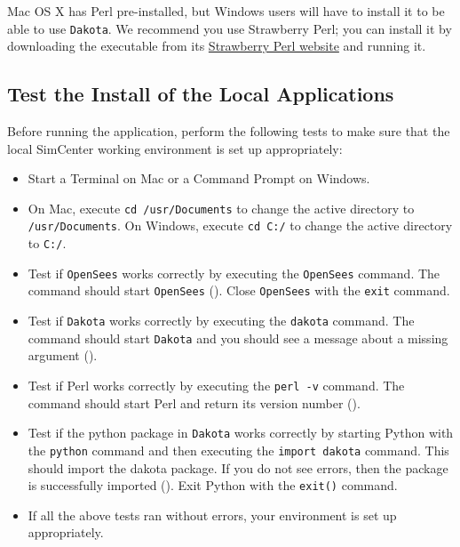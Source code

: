 Mac OS X has Perl pre-installed, but Windows users will have to
install it to be able to use \texttt{Dakota}. We recommend you use Strawberry
Perl; you can install it by downloading the executable from
its \href{http://strawberryperl.com}{Strawberry Perl website} and
running it.

\subsection{Test the Install of the Local Applications}

Before running the \texttt{\getsoftwarename{}} application, perform the following tests to
make sure that the local SimCenter working environment is set up
appropriately:

\begin{itemize}
    \item Start a Terminal on Mac or a Command Prompt on Windows.
    \item On Mac, execute \texttt{cd /usr/Documents} to change the active directory to \texttt{/usr/Documents}. On Windows, execute \texttt{cd C:/} to change the active directory to \texttt{C:/}.
    \item Test if \texttt{OpenSees} works correctly by executing the \texttt{OpenSees} command. The command should start \texttt{OpenSees} (). Close \texttt{OpenSees} with the \texttt{exit} command.
    \item Test if \texttt{Dakota} works correctly by executing the \texttt{dakota} command. The command should start \texttt{Dakota} and you should see a message about a missing argument ().
    \item Test if Perl works correctly by executing the \texttt{perl -v} command. The command should start Perl and return its version number ().
    \item Test if the python package in \texttt{Dakota} works correctly by starting Python with the \texttt{python} command and then executing the \texttt{import dakota} command. This should import the dakota package. If you do not see errors, then the package is successfully imported (). Exit Python with the \texttt{exit()} command.
    \item If all the above tests ran without errors, your environment is set up appropriately.
\end{itemize}

